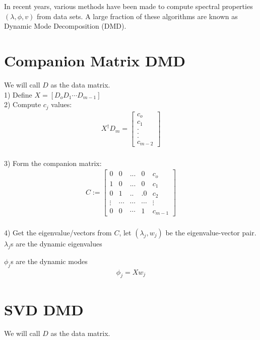 \documentclass{article}
\begin{document}
In recent years, various methods have been made to compute spectral properties $(\lambda,\phi,v)$ from data sets. A large fraction of these algorithms are known as Dynamic Mode Decomposition (DMD).

\section{Companion Matrix DMD}
We will call $D$ as the data matrix.\\

1) Define $X=[D_o D_1 \cdots D_{m-1}]$\\

2) Compute $c_j$ values:\\
\begin{align*}
X^\dagger D_m = \begin{bmatrix}
c_o \\
c_1 \\
.\\
.\\
.\\
c_{m-2}
\end{bmatrix}
\end{align*}\\

3) Form the companion matrix:
\begin{align*}
C:= \begin{bmatrix}
0 & 0 &...& 0 &c_o \\
1 &0& ...&  0& c_1 \\
0 &1& ..&. 0& c_2 \\
\vdots& \cdots& \cdots& \cdots & \vdots \\
0 &0& \cdots& 1& c_{m-1}
\end{bmatrix}
\end{align*}\\

4) Get the eigenvalue/vectors from $C$, let $(\lambda_j,w_j)$ be the eigenvalue-vector pair.\\

$\lambda_j$s are the dynamic eigenvalues\

$\phi_j$s are the dynamic modes\\
\begin{align*}
\phi_j=Xw_j
\end{align*}

\section{SVD DMD}
We will call $D$ as the data matrix.\\
\end{document}
